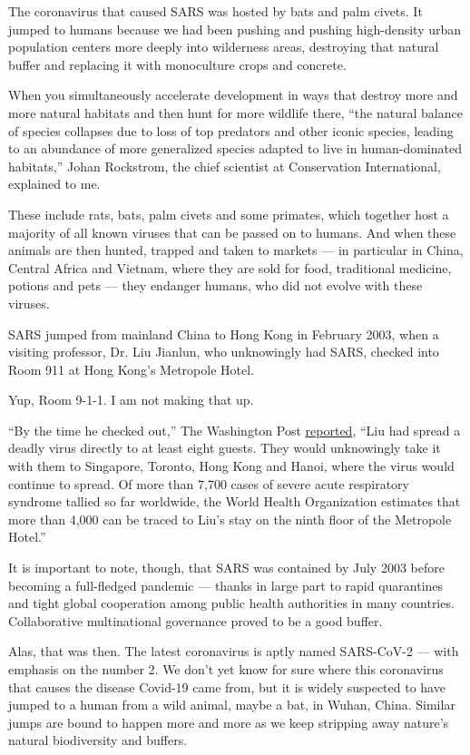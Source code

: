 The coronavirus that caused SARS was hosted by bats and palm civets. It
jumped to humans because we had been pushing and pushing high-density
urban population centers more deeply into wilderness areas, destroying
that natural buffer and replacing it with monoculture crops and
concrete.

When you simultaneously accelerate development in ways that destroy more
and more natural habitats and then hunt for more wildlife there, ``the
natural balance of species collapses due to loss of top predators and
other iconic species, leading to an abundance of more generalized
species adapted to live in human-dominated habitats,'' Johan Rockstrom,
the chief scientist at Conservation International, explained to me.

These include rats, bats, palm civets and some primates, which together
host a majority of all known viruses that can be passed on to humans.
And when these animals are then hunted, trapped and taken to markets ---
in particular in China, Central Africa and Vietnam, where they are sold
for food, traditional medicine, potions and pets --- they endanger
humans, who did not evolve with these viruses.

SARS jumped from mainland China to Hong Kong in February 2003, when a
visiting professor, Dr. Liu Jianlun, who unknowingly had SARS, checked
into Room 911 at Hong Kong's Metropole Hotel.

Yup, Room 9-1-1. I am not making that up.

``By the time he checked out,'' The Washington Post
\href{https://www.washingtonpost.com/archive/politics/2003/05/20/sars-signals-missed-in-hong-kong/50ff4807-4862-4229-8bbd-ec5932b5c896/}{reported},
``Liu had spread a deadly virus directly to at least eight guests. They
would unknowingly take it with them to Singapore, Toronto, Hong Kong and
Hanoi, where the virus would continue to spread. Of more than 7,700
cases of severe acute respiratory syndrome tallied so far worldwide, the
World Health Organization estimates that more than 4,000 can be traced
to Liu's stay on the ninth floor of the Metropole Hotel.''

It is important to note, though, that SARS was contained by July 2003
before becoming a full-fledged pandemic --- thanks in large part to
rapid quarantines and tight global cooperation among public health
authorities in many countries. Collaborative multinational governance
proved to be a good buffer.

Alas, that was then. The latest coronavirus is aptly named SARS-CoV-2
--- with emphasis on the number 2. We don't yet know for sure where this
coronavirus that causes the disease Covid-19 came from, but it is widely
suspected to have jumped to a human from a wild animal, maybe a bat, in
Wuhan, China. Similar jumps are bound to happen more and more as we keep
stripping away nature's natural biodiversity and buffers.

